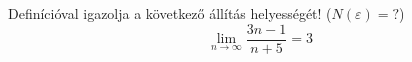 \documentclass[11pt]{scrartcl}
\begin{document}
Definícióval igazolja a következő állítás helyességét! ($N(\varepsilon) = ?$)
\[
	\lim_{n \to \infty} \frac{3n - 1}{n + 5} = 3
\]
\end{document}
